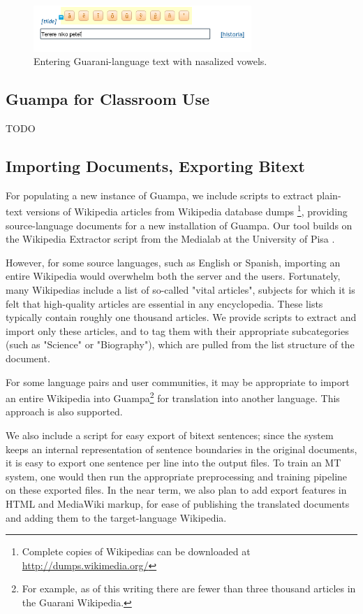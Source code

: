 \documentclass[10pt, a4paper]{article}
\begin{document}
\begin{figure}
\includegraphics[width=8.25cm]{guampa-tildes}
\caption{Entering Guarani-language text with nasalized vowels.}
\end{figure}

\subsection{Guampa for Classroom Use}

TODO

\subsection{Importing Documents, Exporting Bitext}
For populating a new instance of Guampa, we include scripts to extract
plain-text versions of Wikipedia articles from Wikipedia database dumps
\footnote{Complete copies of Wikipedias can be downloaded at \\
\url{http://dumps.wikimedia.org/}}, providing source-language documents for a
new installation of Guampa. Our tool builds on the Wikipedia Extractor
script from the Medialab at the University of Pisa \cite{pisa-wp-extractor}.

However, for some source languages, such as English or Spanish, importing an
entire Wikipedia would overwhelm both the server and the users. Fortunately,
many Wikipedias include a list of so-called "vital articles", subjects for
which it is felt that high-quality articles are essential in any encyclopedia.
These lists typically contain roughly one thousand articles. We provide scripts
to extract and import only these articles, and to tag them with their
appropriate subcategories (such as "Science" or "Biography"), which are pulled
from the list structure of the document.

For some language pairs and user communities, it may be appropriate to import
an entire Wikipedia into Guampa\footnote{
For example, as of this writing there are fewer than three thousand
articles in the Guarani Wikipedia.}
for translation into another language. This approach is also supported.

We also include a script for easy export of bitext sentences; since the system
keeps an internal representation of sentence boundaries in the original
documents, it is easy to export one sentence per line into the output files. To
train an MT system, one would then run the appropriate preprocessing and
training pipeline on these exported files. In the near term, we also plan to
add export features in HTML and MediaWiki markup, for ease of publishing the
translated documents and adding them to the target-language Wikipedia.
\end{document}
